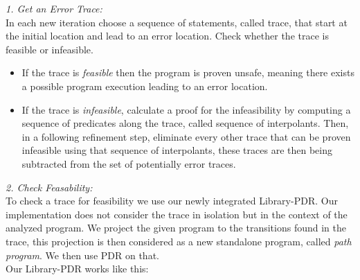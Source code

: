\documentclass[11pt, a4paper, BCOR=10mm, ngerman]{scrbook}
\begin{document}
\textsl{1. Get an Error Trace:} \\
In each new iteration choose a sequence of statements, called trace, that start at the initial location and lead to an error location. Check whether the trace is feasible or infeasible.
 \begin{itemize}
	\item If the trace is \textsl{feasible} then the program is proven unsafe, meaning there exists a possible program execution leading to an error location.
	\item If the trace is \textsl{infeasible}, calculate a proof for the infeasibility by computing a sequence of predicates along the trace, called sequence of interpolants. Then, in a following refinement step, eliminate every other trace that can be proven infeasible using that sequence of interpolants, these traces are then being subtracted from the set of potentially error traces.
 \end{itemize}

\textsl{2. Check Feasability:} \\
To check a trace for feasibility we use our newly integrated Library-PDR. 
Our implementation does not consider the trace in isolation but in the context of the analyzed program. We project the given program to the transitions found in the trace, this projection is then considered as a new standalone program, called \textsl{path program}. We then use PDR on that. \\ Our Library-PDR works like this:
\end{document}
